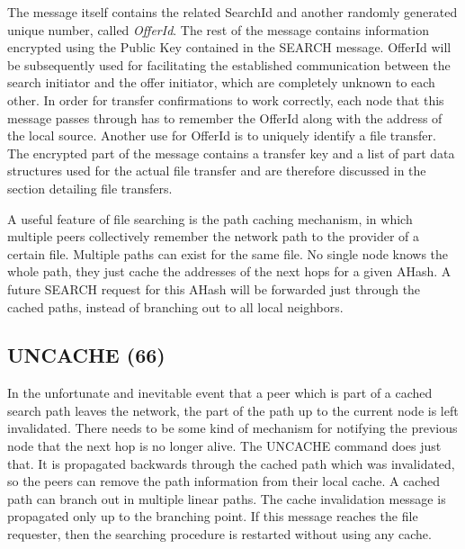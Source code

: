 The message itself contains the related SearchId and another randomly generated 
unique number, called \textit{OfferId}. The rest of the message contains 
information encrypted using the Public Key contained in the SEARCH message. 
OfferId will be subsequently used for facilitating the established 
communication between the search initiator and the offer initiator, which are 
completely unknown to each other. In order for transfer confirmations to work
correctly, each node that this message passes through has to remember the
OfferId along with the address of the local source. Another use for OfferId is
to uniquely identify a file transfer. The encrypted part of the message contains
a transfer key and a list of part data structures used for the actual file
transfer and are therefore discussed in the section detailing file transfers.

A useful feature of file searching is the path caching mechanism, in which 
multiple peers collectively remember the network path to the provider of a 
certain file. Multiple paths can exist for the same file. No single node knows 
the whole path, they just cache the addresses of the next hops for a given 
AHash. A future SEARCH request for this AHash will be forwarded just through 
the cached paths, instead of branching out to all local neighbors.

\begin{figure}[H]
    \centering
\end{figure}

\subsection{UNCACHE (66)}

In the unfortunate and inevitable event that a peer which is part of a cached 
search path leaves the network, the part of the path up to the current node is 
left invalidated. There needs to be some kind of mechanism for notifying the 
previous node that the next hop is no longer alive. The UNCACHE command does 
just that. It is propagated backwards through the cached path which was 
invalidated, so the peers can remove the path information from their local 
cache. A cached path can branch out in multiple linear paths. The cache
invalidation message is propagated only up to the branching point. If this
message reaches the file requester, then the searching procedure is restarted
without using any cache.

